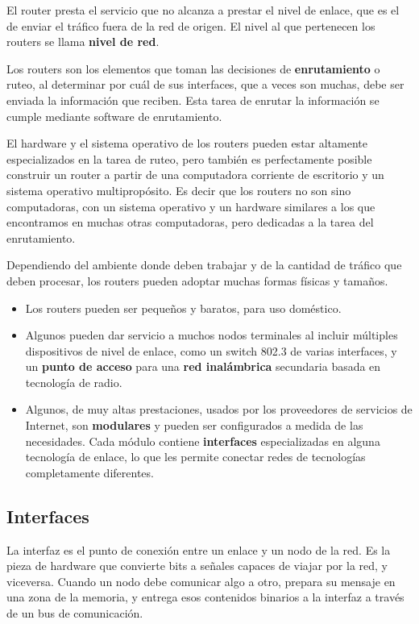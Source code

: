 \documentclass[spanish,A4,]{article}
\begin{document}
El router presta el servicio que no alcanza a prestar el nivel de
enlace, que es el de enviar el tráfico fuera de la red de origen. El
nivel al que pertenecen los routers se llama \textbf{nivel de red}.

Los routers son los elementos que toman las decisiones de
\textbf{enrutamiento} o ruteo, al determinar por cuál de sus interfaces,
que a veces son muchas, debe ser enviada la información que reciben.
Esta tarea de enrutar la información se cumple mediante software de
enrutamiento.

El hardware y el sistema operativo de los routers pueden estar altamente
especializados en la tarea de ruteo, pero también es perfectamente
posible construir un router a partir de una computadora corriente de
escritorio y un sistema operativo multipropósito. Es decir que los
routers no son sino computadoras, con un sistema operativo y un hardware
similares a los que encontramos en muchas otras computadoras, pero
dedicadas a la tarea del enrutamiento.

Dependiendo del ambiente donde deben trabajar y de la cantidad de
tráfico que deben procesar, los routers pueden adoptar muchas formas
físicas y tamaños.

\begin{itemize}
\item
  Los routers pueden ser pequeños y baratos, para uso doméstico.
\item
  Algunos pueden dar servicio a muchos nodos terminales al incluir
  múltiples dispositivos de nivel de enlace, como un switch 802.3 de
  varias interfaces, y un \textbf{punto de acceso} para una \textbf{red
  inalámbrica} secundaria basada en tecnología de radio.
\item
  Algunos, de muy altas prestaciones, usados por los proveedores de
  servicios de Internet, son \textbf{modulares} y pueden ser
  configurados a medida de las necesidades. Cada módulo contiene
  \textbf{interfaces} especializadas en alguna tecnología de enlace, lo
  que les permite conectar redes de tecnologías completamente
  diferentes.
\end{itemize}

\subsection{Interfaces}\label{interfaces}

La interfaz es el punto de conexión entre un enlace y un nodo de la red.
Es la pieza de hardware que convierte bits a señales capaces de viajar
por la red, y viceversa. Cuando un nodo debe comunicar algo a otro,
prepara su mensaje en una zona de la memoria, y entrega esos contenidos
binarios a la interfaz a través de un bus de comunicación.
\end{document}
